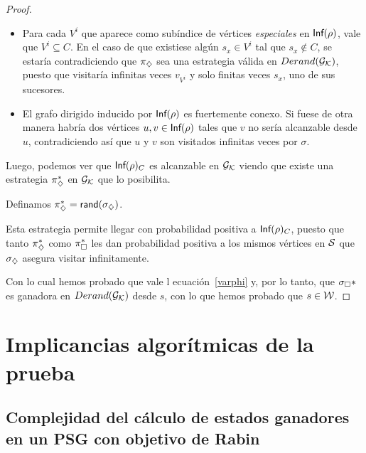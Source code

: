 \begin{proof}

	\begin{itemize}
		\item Para cada $V^i$ que aparece como subíndice de vértices \textit{especiales} en
		      $\textsf{Inf}(\rho)$, vale que $V^i \subseteq C$. En el caso de que existiese algún
		      $s_x \in V^i$ tal que $s_x \notin C$, se estaría contradiciendo que $\pi_\diamondsuit$
		      sea una estrategia válida en $Derand(\mathcal{G}_{\mathcal{K}})$, puesto que visitaría infinitas veces
		      $v_{V^i}$ y solo finitas veces $s_x$, uno de sus sucesores.
		\item El grafo dirigido inducido por $\textsf{Inf}(\rho)$ es fuertemente conexo. Si fuese de
		      otra manera habría dos vértices $u, v \in \textsf{Inf}(\rho)$ tales que $v$ no sería
		      alcanzable desde $u$, contradiciendo así que $u$ y $v$ son visitados infinitas
		      veces por $\sigma$.
	\end{itemize}

	Luego, podemos ver que $\textsf{Inf}(\rho)_C$ es alcanzable en $\mathcal{G}_{\mathcal{K}}$ viendo que existe
	una estrategia $\pi_\diamondsuit^*$ en $\mathcal{G}_{\mathcal{K}}$ que lo posibilita.

	Definamos $\pi_\diamondsuit^* = \textsf{rand}(\sigma_\diamondsuit)$.

	Esta estrategia permite llegar con probabilidad positiva a $\textsf{Inf}(\rho)_C$,
	puesto que tanto $\pi_\diamondsuit^*$ como $\pi_\square^*$ les dan probabilidad positiva a
	los mismos vértices en $\mathcal{S}$ que $\sigma_\diamondsuit$ asegura visitar infinitamente.

	Con lo cual hemos probado que vale l ecuación~\ref{varphi} y, por lo tanto, que
	$\sigma_\square*$ es ganadora en $Derand(\mathcal{G}_{\mathcal{K}})$ desde $s$, con lo que hemos probado que
	$s \in \mathcal{W}$.

\end{proof}

\section{Implicancias algorítmicas de la prueba}

\subsection*{Complejidad del cálculo de estados ganadores en un PSG con objetivo de Rabin}

